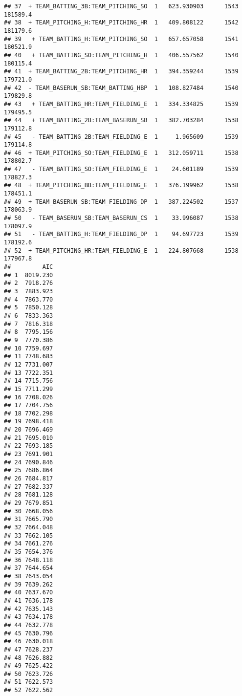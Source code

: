 \documentclass[
]{article}
\newenvironment{Shaded}{\begin{snugshade}}{\end{snugshade}}
\newcommand{\CommentTok}[1]{\textcolor[rgb]{0.56,0.35,0.01}{\textit{#1}}}
\newcommand{\DataTypeTok}[1]{\textcolor[rgb]{0.13,0.29,0.53}{#1}}
\newcommand{\DecValTok}[1]{\textcolor[rgb]{0.00,0.00,0.81}{#1}}
\newcommand{\FloatTok}[1]{\textcolor[rgb]{0.00,0.00,0.81}{#1}}
\newcommand{\KeywordTok}[1]{\textcolor[rgb]{0.13,0.29,0.53}{\textbf{#1}}}
\newcommand{\NormalTok}[1]{#1}
\newcommand{\OperatorTok}[1]{\textcolor[rgb]{0.81,0.36,0.00}{\textbf{#1}}}
\newcommand{\OtherTok}[1]{\textcolor[rgb]{0.56,0.35,0.01}{#1}}
\newcommand{\StringTok}[1]{\textcolor[rgb]{0.31,0.60,0.02}{#1}}
\begin{document}
\begin{verbatim}
## 37  + TEAM_BATTING_3B:TEAM_PITCHING_SO  1   623.930903      1543   181589.4
## 38  + TEAM_PITCHING_H:TEAM_PITCHING_HR  1   409.808122      1542   181179.6
## 39   + TEAM_BATTING_H:TEAM_PITCHING_SO  1   657.657058      1541   180521.9
## 40   + TEAM_BATTING_SO:TEAM_PITCHING_H  1   406.557562      1540   180115.4
## 41  + TEAM_BATTING_2B:TEAM_PITCHING_HR  1   394.359244      1539   179721.0
## 42  - TEAM_BASERUN_SB:TEAM_BATTING_HBP  1   108.827484      1540   179829.8
## 43   + TEAM_BATTING_HR:TEAM_FIELDING_E  1   334.334825      1539   179495.5
## 44   + TEAM_BATTING_2B:TEAM_BASERUN_SB  1   382.703284      1538   179112.8
## 45   - TEAM_BATTING_2B:TEAM_FIELDING_E  1     1.965609      1539   179114.8
## 46  + TEAM_PITCHING_SO:TEAM_FIELDING_E  1   312.059711      1538   178802.7
## 47   - TEAM_BATTING_SO:TEAM_FIELDING_E  1    24.601189      1539   178827.3
## 48  + TEAM_PITCHING_BB:TEAM_FIELDING_E  1   376.199962      1538   178451.1
## 49  + TEAM_BASERUN_SB:TEAM_FIELDING_DP  1   387.224502      1537   178063.9
## 50   - TEAM_BASERUN_SB:TEAM_BASERUN_CS  1    33.996087      1538   178097.9
## 51   - TEAM_BATTING_H:TEAM_FIELDING_DP  1    94.697723      1539   178192.6
## 52  + TEAM_PITCHING_HR:TEAM_FIELDING_E  1   224.807668      1538   177967.8
##         AIC
## 1  8019.230
## 2  7918.276
## 3  7883.923
## 4  7863.770
## 5  7850.128
## 6  7833.363
## 7  7816.318
## 8  7795.156
## 9  7770.386
## 10 7759.697
## 11 7748.683
## 12 7731.007
## 13 7722.351
## 14 7715.756
## 15 7711.299
## 16 7708.026
## 17 7704.756
## 18 7702.298
## 19 7698.418
## 20 7696.469
## 21 7695.010
## 22 7693.185
## 23 7691.901
## 24 7690.846
## 25 7686.864
## 26 7684.817
## 27 7682.337
## 28 7681.128
## 29 7679.851
## 30 7668.056
## 31 7665.790
## 32 7664.048
## 33 7662.105
## 34 7661.276
## 35 7654.376
## 36 7648.118
## 37 7644.654
## 38 7643.054
## 39 7639.262
## 40 7637.670
## 41 7636.178
## 42 7635.143
## 43 7634.178
## 44 7632.778
## 45 7630.796
## 46 7630.018
## 47 7628.237
## 48 7626.882
## 49 7625.422
## 50 7623.726
## 51 7622.573
## 52 7622.562
\end{verbatim}

\begin{Shaded}
\end{Shaded}
\end{document}
